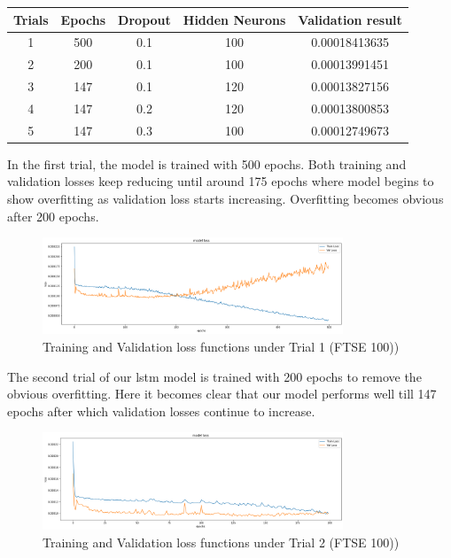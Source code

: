 \documentclass[a4paper,11pt,oneside]{book}
\begin{document}
\begin{center}
	\begin{tabular}{||c c c c c||} 
		\hline
		Trials & Epochs & Dropout & Hidden Neurons & Validation result\\ [0.5ex] 
		\hline\hline
		1 & 500 & 0.1 & 100 & 0.00018413635 \\ 
		\hline
		2 & 200 & 0.1 & 100 & 0.00013991451 \\
		\hline
		3 & 147 & 0.1 & 120 & 0.00013827156 \\
		\hline
		4 & 147 & 0.2 & 120 & 0.00013800853 \\
		\hline
		5 & 147 & 0.3 & 100 & 0.00012749673\\ [1ex] 
		\hline
	\end{tabular}
\end{center}

In the first trial, the model is trained with 500 epochs. Both training and validation losses keep reducing until around 175 epochs where model begins to show overfitting as validation loss starts increasing. Overfitting becomes obvious after 200 epochs.

\begin{figure}[!h]
	\centering
	\includegraphics[width=0.8\textwidth]{figures/FTSE1}
	\caption{Training and Validation loss functions under Trial 1 (FTSE 100))}
	\label{FTSE1}
\end{figure}
 The second trial of our lstm model is trained with 200 epochs to remove the obvious overfitting. Here it becomes clear that our model performs well till 147 epochs after which validation losses continue to increase. 
\begin{figure}[!h]
	\centering
	\includegraphics[width=0.8\textwidth]{figures/FTSE2}
	\caption{Training and Validation loss functions under Trial 2 (FTSE 100))}
	\label{FTSE2}
\end{figure}\newline
\end{document}
